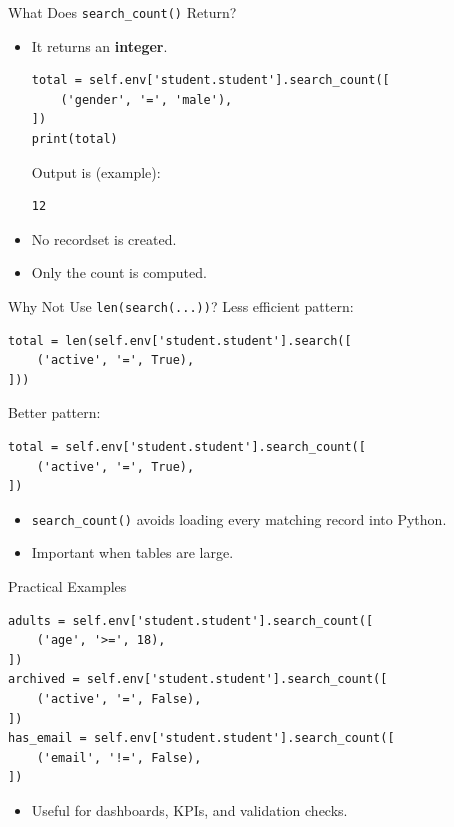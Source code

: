 \begin{frame}[fragile]{What Does \texttt{search\_count()} Return?}
	\begin{block}{}
		\begin{itemize}
			\item It returns an \textbf{integer}.
\begin{lstlisting}
total = self.env['student.student'].search_count([
	('gender', '=', 'male'),
])
print(total)
\end{lstlisting}
			Output is (example):
\begin{lstlisting}
12
\end{lstlisting}
			\item No recordset is created.
			\item Only the count is computed.
		\end{itemize}
	\end{block}
\end{frame}

\begin{frame}[fragile]{Why Not Use \texttt{len(search(...))}?}
	Less efficient pattern:
\begin{lstlisting}
total = len(self.env['student.student'].search([
	('active', '=', True),
]))
\end{lstlisting}
	Better pattern:
\begin{lstlisting}
total = self.env['student.student'].search_count([
	('active', '=', True),
])
\end{lstlisting}
	\begin{itemize}
		\item \texttt{search\_count()} avoids loading every matching record into Python.
		\item Important when tables are large.
	\end{itemize}
\end{frame}

\begin{frame}[fragile]{Practical Examples}
\begin{lstlisting}
adults = self.env['student.student'].search_count([
	('age', '>=', 18),
])
archived = self.env['student.student'].search_count([
	('active', '=', False),
])
has_email = self.env['student.student'].search_count([
	('email', '!=', False),
])
\end{lstlisting}
	\begin{itemize}
		\item Useful for dashboards, KPIs, and validation checks.
	\end{itemize}
\end{frame}

